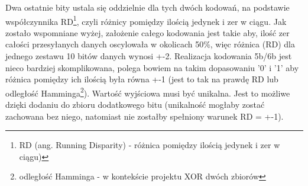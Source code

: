 \documentclass{BscUS}
\begin{document}
Dwa ostatnie bity ustala się oddzielnie dla tych dwóch kodowań, na podstawie współczynnika RD\footnote{RD (ang. Running Disparity) - różnica pomiędzy ilością jedynek i zer w ciągu)}, czyli różnicy pomiędzy ilością jedynek i zer w ciągu. Jak zostało wspomniane wyżej, założenie całego kodowania jest takie aby, ilość zer całości przesyłanych danych oscylowała w okolicach 50\%, więc różnica (RD) dla jednego zestawu 10 bitów danych wynosi +-2.
\newline
\indent Realizacja kodowania 5b/6b jest nieco bardziej skomplikowana, polega bowiem na takim dopasowaniu '0' i '1' aby różnica pomiędzy ich ilością była równa +-1 (jest to tak na prawdę RD lub odległość Hamminga\footnote{odległość Hamminga - w kontekście projektu XOR dwóch zbiorów}). Wartość wyjściowa musi być unikalna. Jest to możliwe dzięki dodaniu do zbioru dodatkowego bitu (unikalność mogłaby zostać zachowana bez niego, natomiast nie zostałby spełniony warunek RD = +-1).
\newline 
\end{document}

